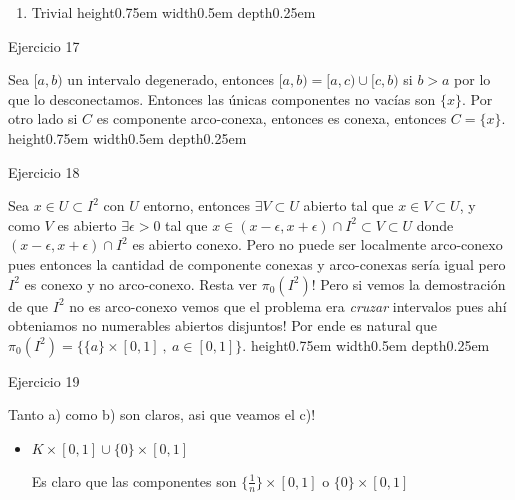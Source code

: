 \documentclass[11pt]{article}
\newcommand{\sett}[1]{\{#1\}}
\newcommand{\sette}[2]{\{#1 \ , \ #2 \}}
\newenvironment{proof}[1][Demostraci\'on]{\begin{trivlist}
\item[\hskip \labelsep {\bfseries #1}]}{\end{trivlist}}
\newcommand{\qed}{\nobreak \ifvmode \relax \else
      \ifdim\lastskip<1.5em \hskip-\lastskip
      \hskip1.5em plus0em minus0.5em \fi \nobreak
      \vrule height0.75em width0.5em depth0.25em\fi}
\begin{document}
\begin{enumerate}
\begin{proof}
\begin{enumerate}
\item Trivial \qed

\end{enumerate}

\end{proof}

\item {Ejercicio 17}

\begin{proof}

Sea $[a,b)$ un intervalo degenerado, entonces $[a,b) = [a,c) \cup [c,b)$ si $b > a$ por lo que lo desconectamos. Entonces las \'unicas componentes no vac\'ias son $\sett{x}$. Por otro lado si $C$ es componente arco-conexa, entonces es conexa, entonces $C = \sett{x}$. \qed

\end{proof}

\item {Ejercicio 18}

\begin{proof}

Sea $x \in U \subset I^2$ con $U$ entorno, entonces $\exists V \subset U$ abierto tal que $x \in V \subset U$, y como $V$ es abierto $\exists \epsilon > 0$ tal que $x \in (x-\epsilon,x+\epsilon)\cap I^2 \subset V \subset U$ donde $(x-\epsilon,x+\epsilon) \cap I^2$ es abierto conexo. Pero no puede ser localmente arco-conexo pues entonces la cantidad de componente conexas y arco-conexas ser\'ia igual pero $I^2$ es conexo y no arco-conexo. Resta ver $\pi_0(I^2)!$ Pero si vemos la demostraci\'on de que $I^2$ no es arco-conexo vemos que el problema era \textit{cruzar} intervalos pues ah\'i obteniamos no numerables abiertos disjuntos! Por ende es natural que  $\pi_0(I^2) = \sette{\sett{a} \times [0,1]}{a \in [0,1]}$. \qed

\end{proof}

\item {Ejercicio 19}

\begin{proof}

Tanto a) como b) son claros, asi que veamos el c)!

\begin{itemize}

\item {$K \times [0,1] \cup \sett{0} \times [0,1]$}

Es claro que las componentes son $\sett{\frac{1}{n}} \times [0,1]$ o $\sett{0} \times [0,1]$


\end{itemize}
\end{proof}
\end{enumerate}
\end{document}
